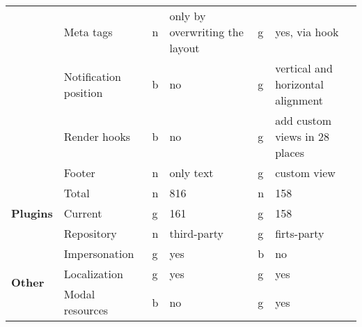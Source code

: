 \begin{table}[]
{\begin{tabular}{llllll}
            & Meta tags              & n  & only by overwriting the layout & g  & yes, via hook                           \\
            & Notification position  & b  & no                             & g  & vertical and horizontal alignment       \\
            & Render hooks           & b  & no                             & g  & add custom views in 28 places           \\
            & Footer                 & n  & only text                      & g  & custom view                             \\
            \hline
            \multirow{3}{*}{\textbf{Plugins}}        & Total                  & n  & 816                            & n  & 158                                     \\
            & Current                & g  & 161                            & g  & 158                                     \\
            & Repository             & n  & third-party                    & g  & firts-party                             \\
            \hline
            \multirow{3}{*}{\textbf{Other}}          & Impersonation          & g  & yes                            & b  & no                                      \\
            & Localization           & g  & yes                            & g  & yes                                     \\
            & Modal resources        & b  & no                             & g  & yes
        \end{tabular}%
    }
\end{table}
